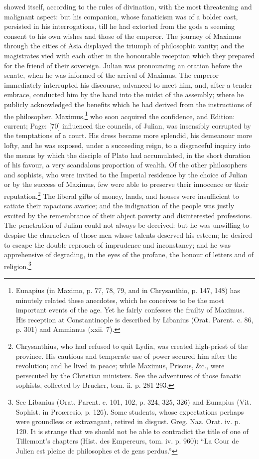 showed itself, according to the rules of divination, with the most threatening and malignant aspect: but his companion, whose fanaticism was of a bolder cast, persisted in his interrogations, till he had extorted from the gods a seeming consent to his own wishes and those of the emperor. The journey of Maximus through the cities of Asia displayed the triumph of philosophic vanity; and the magistrates vied with each other in the honourable reception which they prepared for the friend of their sovereign. Julian was pronouncing an oration before the senate, when he was informed of the arrival of Maximus. The emperor immediately interrupted his discourse, advanced to meet him, and, after a tender embrace, conducted him by the hand into the midst of the assembly; where he publicly acknowledged the benefits which he had derived from the instructions of the philosopher. Maximus,\footnote{Eunapius (in Maximo, p. 77, 78, 79, and in Chrysanthio, p. 147, 148) has minutely related these anecdotes, which he conceives to be the most important events of the age. Yet he fairly confesses the frailty of Maximus. His reception at Constantinople is described by Libanius (Orat. Parent. c. 86, p. 301) and Ammianus (xxii. 7).} who soon acquired the confidence, and Edition: current; Page: [70] influenced the councils, of Julian, was insensibly corrupted by the temptations of a court. His dress became more splendid, his demeanour more lofty, and he was exposed, under a succeeding reign, to a disgraceful inquiry into the means by which the disciple of Plato had accumulated, in the short duration of his favour, a very scandalous proportion of wealth. Of the other philosophers and sophists, who were invited to the Imperial residence by the choice of Julian or by the success of Maximus, few were able to preserve their innocence or their reputation.\footnote{Chrysanthius, who had refused to quit Lydia, was created high-priest of the province. His cautious and temperate use of power secured him after the revolution; and he lived in peace; while Maximus, Priscus, \&c., were persecuted by the Christian ministers. See the adventures of those fanatic sophists, collected by Brucker, tom. ii. p. 281-293.} The liberal gifts of money, lands, and houses were insufficient to satiate their rapacious avarice; and the indignation of the people was justly excited by the remembrance of their abject poverty and disinterested professions. The penetration of Julian could not always be deceived: but he was unwilling to despise the characters of those men whose talents deserved his esteem; he desired to escape the double reproach of imprudence and inconstancy; and he was apprehensive of degrading, in the eyes of the profane, the honour of letters and of religion.\footnote{See Libanius (Orat. Parent. c. 101, 102, p. 324, 325, 326) and Eunapius (Vit. Sophist. in Proæresio, p. 126). Some students, whose expectations perhaps were groundless or extravagant, retired in disgust. Greg. Naz. Orat. iv. p. 120. It is strange that we should not be able to contradict the title of one of Tillemont\texthebrew{}’s chapters (Hist. des Empereurs, tom. iv. p. 960): \texthebrew{“}La Cour de Julien est pleine de philosophes et de gens perdus.\texthebrew{}”}

